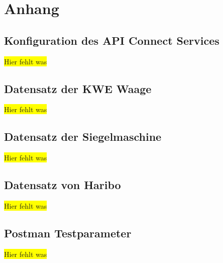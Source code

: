 \chapter{Anhang}
\label{ch:anhang}

\section{Konfiguration des API Connect Services}
\label{sec:konfigurationAPIConnect}
\colorbox{yellow}{Hier fehlt was}

\section{Datensatz der KWE Waage}
\label{sec:scaleData}
\colorbox{yellow}{Hier fehlt was}

\section{Datensatz der Siegelmaschine}
\label{sec:hariboSiegel}
\colorbox{yellow}{Hier fehlt was}

\section{Datensatz von Haribo}
\label{sec:hariboData}
\colorbox{yellow}{Hier fehlt was}

\section{Postman Testparameter}
\label{sec:postmanTestparameter}
\colorbox{yellow}{Hier fehlt was}